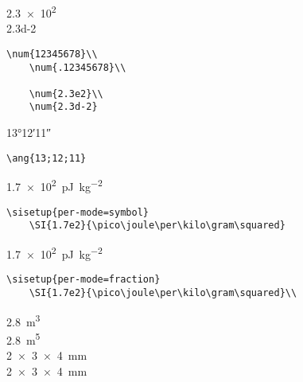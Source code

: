 \num{2.3e2}\\
\num{2.3d-2}\\

\lstset{language=[LaTeX]TeX } %
\begin{lstlisting}[gobble=2, frame=none, numbers=none, backgroundcolor=\color{white},%
	caption={},label={code:}]
	\num{12345678}\\
	\num{.12345678}\\

	\num{2.3e2}\\
	\num{2.3d-2}
\end{lstlisting}


\ang{13;12;11}\\

\lstset{language=[LaTeX]TeX } %
\begin{lstlisting}[gobble=2, frame=none, numbers=none, backgroundcolor=\color{white},%
	caption={},label={code:}]
	\ang{13;12;11}
\end{lstlisting}


\SI{1.7e2}{\pico\joule\per\kilo\gram\squared}\\

\lstset{language=[LaTeX]TeX } %
\begin{lstlisting}[gobble=2, frame=none, numbers=none, backgroundcolor=\color{white},%
	caption={},label={code:}]
	\sisetup{per-mode=symbol}
	\SI{1.7e2}{\pico\joule\per\kilo\gram\squared}
\end{lstlisting}


\SI{1.7e2}{\pico\joule\per\kilo\gram\squared}\\

\lstset{language=[LaTeX]TeX } %
\begin{lstlisting}[gobble=2, frame=none, numbers=none, backgroundcolor=\color{white},%
	caption={},label={code:}]
	\sisetup{per-mode=fraction}
	\SI{1.7e2}{\pico\joule\per\kilo\gram\squared}\\
\end{lstlisting}


\SI{2.8}{\meter\cubed}\\
\SI{2.8}{\meter\tothe{5}}\\
\SI{2 x 3 x 4}{\milli\meter}\\
\SI[product-units=power]{2 x 3 x 4}{\milli\meter}\\


